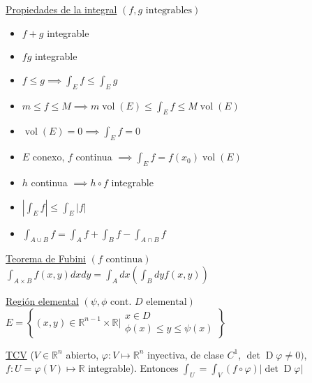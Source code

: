 \documentclass[12pt]{article}
\newcommand{\real}{\mathbb{R}}
\newcommand\setb[1]{\left\{#1\right\}}
\newcommand{\abs}[1]{\left\vert #1 \right\vert}
\DeclareMathOperator{\vol}{vol}
\DeclareMathOperator{\D}{D}
\begin{document}
\begin{multicols}{3}
	\underline{Propiedades de la integral} $\left( f,g \text{ integrables} \right)$
	\begin{itemize}
		\itemsep0em
		\item $f+g$ integrable
		\item $fg$ integrable
		\item $f \leq g \implies \int_E f \leq \int_E g$ 
		\item $m \leq f \leq M \implies m\vol(E) \leq \int_E f \leq M\vol(E)$
		\item $\vol(E)=0 \implies \int_E f = 0$
		\item $E$ conexo, $f$ continua $\implies \int_E f = f(x_0)\vol(E)$
		\item $h$ continua $\implies h \circ f$ integrable
		\item $\abs{\int_E f} \leq \int_E \abs{f}$
		\item $\int_{A \cup B} f = \int_A f + \int_B f - \int_{A \cap B} f$
	\end{itemize}
	
	\underline{Teorema de Fubini} $\left( f \text{ continua} \right)$
	$\int_{A\times B} f(x,y) dx dy = \int_A dx \left( \int_B dy f(x,y) \right)$
	
	\underline{Región elemental} $\left( \psi, \phi \text{ cont. } D \text{ elemental} \right)$
	$E = \setb{(x,y) \in \real^{n-1} \times \real \vert \substack{x \in D \\
			\phi(x) \leq y \leq \psi(x)}}$
	
	\underline{TCV}
	($V \in \real^n$ abierto, $\varphi \colon V \mapsto \real^n$ inyectiva, de clase $C^1$, 
	$\det \D\varphi \neq 0)$, $f \colon U=\varphi(V) \mapsto \real$ integrable). Entonces
	$\int_U = \int_V (f \circ \varphi) |\det \D \varphi|$
\end{multicols}
\newpage
\end{document}
